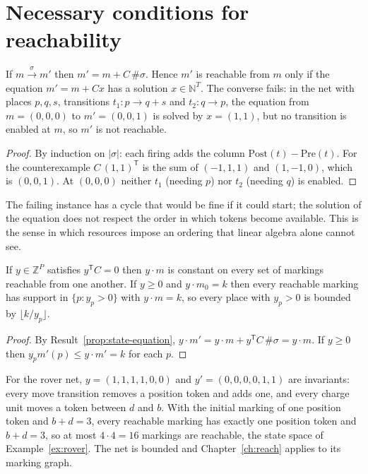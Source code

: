 \section{Necessary conditions for reachability}

\begin{newresult}\label{prop:state-equation}
If $m\xrightarrow{\sigma}m'$ then $m'=m+C\,\#\sigma$. Hence $m'$ is reachable from $m$ only if the equation $m'=m+Cx$ has a solution $x\in\mathbb N^{T}$. The converse fails: in the net with places $p,q,s$, transitions $t_1:p\to q+s$ and $t_2:q\to p$, the equation from $m=(0,0,0)$ to $m'=(0,0,1)$ is solved by $x=(1,1)$, but no transition is enabled at $m$, so $m'$ is not reachable.
\end{newresult}
\begin{proof}
By induction on $|\sigma|$: each firing adds the column $\mathrm{Post}(t)-\mathrm{Pre}(t)$. For the counterexample $C\,(1,1)^{\mathsf T}$ is the sum of $(-1,1,1)$ and $(1,-1,0)$, which is $(0,0,1)$. At $(0,0,0)$ neither $t_1$ (needing $p$) nor $t_2$ (needing $q$) is enabled.
\end{proof}

The failing instance has a cycle that would be fine if it could start; the solution of the equation does not respect the order in which tokens become available. This is the sense in which resources impose an ordering that linear algebra alone cannot see.

\begin{newresult}\label{prop:invariants}
If $y\in\mathbb Z^{P}$ satisfies $y^{\mathsf T}C=0$ then $y\cdot m$ is constant on every set of markings reachable from one another. If $y\ge0$ and $y\cdot m_0=k$ then every reachable marking has support in $\{p:y_p>0\}$ with $y\cdot m=k$, so every place with $y_p>0$ is bounded by $\lfloor k/y_p\rfloor$.
\end{newresult}
\begin{proof}
By Result~\ref{prop:state-equation}, $y\cdot m'=y\cdot m+y^{\mathsf T}C\,\#\sigma=y\cdot m$. If $y\ge0$ then $y_pm'(p)\le y\cdot m'=k$ for each $p$.
\end{proof}

For the rover net, $y=(1,1,1,1,0,0)$ and $y'=(0,0,0,0,1,1)$ are invariants: every move transition removes a position token and adds one, and every charge unit moves a token between $d$ and $b$. With the initial marking of one position token and $b+d=3$, every reachable marking has exactly one position token and $b+d=3$, so at most $4\cdot4=16$ markings are reachable, the state space of Example~\ref{ex:rover}. The net is bounded and Chapter~\ref{ch:reach} applies to its marking graph.

